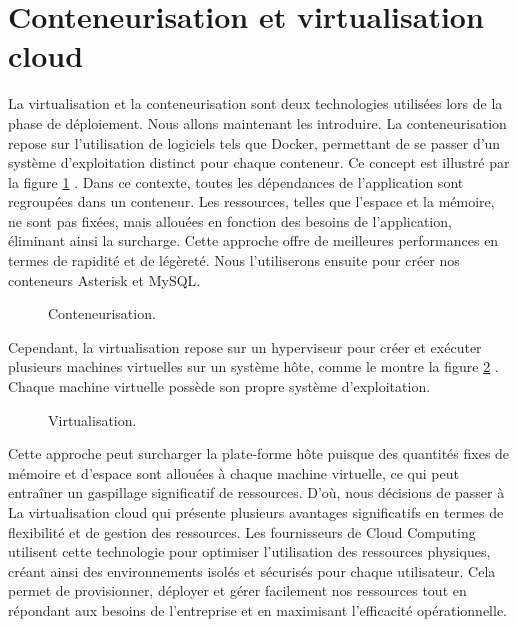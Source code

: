 \section{Conteneurisation et virtualisation cloud}
La virtualisation et la conteneurisation sont deux technologies utilisées lors de la phase de déploiement. Nous allons maintenant les introduire. La conteneurisation \cite{axopen2021docker} repose sur l'utilisation de logiciels tels que Docker, permettant de se passer d'un système d'exploitation distinct pour chaque conteneur. Ce concept est illustré par la figure \ref{fig:cont} \cite{strauss2020}. Dans ce contexte, toutes les dépendances de l'application sont regroupées dans un conteneur. Les ressources, telles que l'espace et la mémoire, ne sont pas fixées, mais allouées en fonction des besoins de l'application, éliminant ainsi la surcharge. Cette approche offre de meilleures performances en termes de rapidité et de légèreté. Nous l'utiliserons ensuite pour créer nos conteneurs Asterisk et MySQL.
\begin{figure}[H]
        \centering
        \caption{Conteneurisation.}
        \label{fig:cont}
        \end{figure}
Cependant, la virtualisation \cite{samarakoon2023} repose sur un hyperviseur pour créer et exécuter plusieurs machines virtuelles sur un système hôte, comme le montre la figure \ref{fig:virtual} \cite{strauss2020}. Chaque machine virtuelle possède son propre système d'exploitation. 
\begin{figure}[H]
        \centering
        \caption{Virtualisation.}
        \label{fig:virtual}
        \end{figure}
Cette approche peut surcharger la plate-forme hôte puisque des quantités fixes de mémoire et d'espace sont allouées à chaque machine virtuelle, ce qui peut entraîner un gaspillage significatif de ressources. D'où, nous décisions de passer à La virtualisation cloud qui présente plusieurs avantages significatifs en termes de flexibilité et de gestion des ressources. Les fournisseurs de Cloud Computing utilisent cette technologie pour optimiser l'utilisation des ressources physiques, créant ainsi des environnements isolés et sécurisés pour chaque utilisateur. Cela permet de provisionner, déployer et gérer facilement nos ressources tout en répondant aux besoins de l'entreprise et en maximisant l'efficacité opérationnelle.

